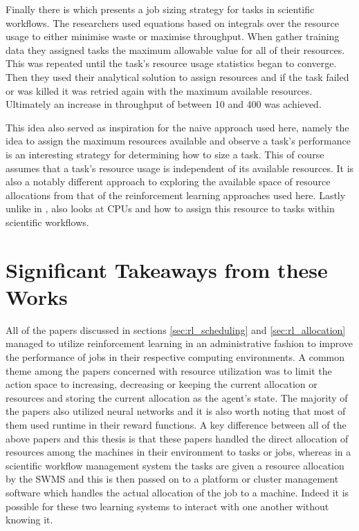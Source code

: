 Finally there is \cite{tovarjob} which presents a job sizing strategy for tasks in scientific workflows. The researchers used equations based on integrals over the resource usage to either minimise waste or maximise throughput. When gather training data they assigned tasks the maximum allowable value for all of their resources. This was repeated until the task’s resource usage statistics began to converge. Then they used their analytical solution to assign resources and if the task failed or was killed it was retried again with the maximum available resources. Ultimately an increase in throughput of between 10 and 400 was achieved.

This idea also served as inspiration for the naive approach used here, namely the idea to assign the maximum resources available and observe a task’s performance is an interesting strategy for determining how to size a task. This of course assumes that a task’s resource usage is independent of its available resources. It is also a notably different approach to exploring the available space of resource allocations from that of the reinforcement learning approaches used here. Lastly unlike in \cite{FeedbackBasedAllocation}, \cite{tovarjob} also looks at CPUs and how to assign this resource to tasks within scientific workflows.

\section{Significant Takeaways from these Works}
\label{sec:takeaways}

All of the papers discussed in sections \ref{sec:rl_scheduling} and \ref{sec:rl_allocation} managed to utilize reinforcement learning in an administrative fashion to improve the performance of jobs in their respective computing environments. A common theme among the papers concerned with resource utilization was to limit the action space to increasing, decreasing or keeping the current allocation or resources and storing the current allocation as the agent’s state. The majority of the papers also utilized neural networks and it is also worth noting that most of them used runtime in their reward functions. A key difference between all of the above papers and this thesis is that these papers handled the direct allocation of resources among the machines in their environment to tasks or jobs, whereas in a scientific workflow management system the tasks are given a resource allocation by the SWMS and this is then passed on to a platform or cluster management software which handles the actual allocation of the job to a machine. Indeed it is possible for these two learning systems to interact with one another without knowing it.

